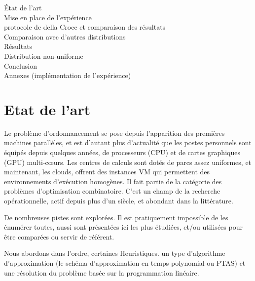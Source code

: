 \documentclass[a4paper,12pt]{report}
\theoremstyle{plain}				%
\theoremstyle{definition}				%
\newcommand{\fco}[1]{\todo[author=FCO,color=teal,inline]{#1}}
\begin{document}
\bigskip
\fco{...Plan une fois terminé...}
État de l'art\\
Mise en place de l'expérience\\
protocole de della Croce et comparaison des résultats\\
Comparaison avec d'autres distributions\\
Résultats\\
Distribution non-uniforme\\
Conclusion \\
Annexes (implémentation de l'expérience)

\section{Etat de l'art} \label{sec:etatDeLArt}

Le problème d'ordonnancement se pose depuis l'apparition des premières machines parallèles, et 
  est d'autant plus d'actualité que les postes personnels sont équipés depuis quelques années, 
  de processeurs (CPU) et de cartes graphiques (GPU) multi-c{\oe}urs.
Les centres de calculs sont dotés de parcs assez uniformes, et maintenant, 
  les clouds, offrent des instances VM qui permettent des environnements 
  d'exécution homogènes.     
Il fait partie de la catégorie des problèmes d'optimisation combinatoire. 
C'est un champ de la recherche opérationnelle, actif depuis plus d'un siècle, 
  et abondant dans la littérature. 

De nombreuses pistes sont explorées. Il est pratiquement impossible de les énumérer toutes, 
  aussi sont présentées ici les plus étudiées, 
  et/ou utilisées pour être comparées ou servir de référent.
  
Nous abordons dans l'ordre, certaines Heuristiques. un type d'algorithme d'approximation (le schéma d'approximation en temps polynomial ou PTAS) et une résolution du problème basée sur la programmation linéaire.
\end{document}
